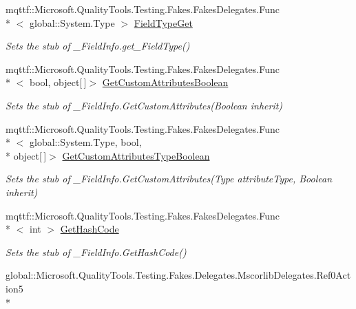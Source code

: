 \begin{DoxyCompactItemize}
mqttf\-::\-Microsoft.\-Quality\-Tools.\-Testing.\-Fakes.\-Fakes\-Delegates.\-Func\\*
$<$ global\-::\-System.\-Type $>$ \hyperlink{class_system_1_1_runtime_1_1_interop_services_1_1_fakes_1_1_stub___field_info_a4656cc895cf577c86e745431b84e3920}{Field\-Type\-Get}
\begin{DoxyCompactList}\small\item\em Sets the stub of \-\_\-\-Field\-Info.\-get\-\_\-\-Field\-Type()\end{DoxyCompactList}\item 
mqttf\-::\-Microsoft.\-Quality\-Tools.\-Testing.\-Fakes.\-Fakes\-Delegates.\-Func\\*
$<$ bool, object\mbox{[}$\,$\mbox{]}$>$ \hyperlink{class_system_1_1_runtime_1_1_interop_services_1_1_fakes_1_1_stub___field_info_a3eb9ddd9adad904f86bac9b9d4c21a9c}{Get\-Custom\-Attributes\-Boolean}
\begin{DoxyCompactList}\small\item\em Sets the stub of \-\_\-\-Field\-Info.\-Get\-Custom\-Attributes(\-Boolean inherit)\end{DoxyCompactList}\item 
mqttf\-::\-Microsoft.\-Quality\-Tools.\-Testing.\-Fakes.\-Fakes\-Delegates.\-Func\\*
$<$ global\-::\-System.\-Type, bool, \\*
object\mbox{[}$\,$\mbox{]}$>$ \hyperlink{class_system_1_1_runtime_1_1_interop_services_1_1_fakes_1_1_stub___field_info_a2c4b375ed678cfe82781c02e8293ce98}{Get\-Custom\-Attributes\-Type\-Boolean}
\begin{DoxyCompactList}\small\item\em Sets the stub of \-\_\-\-Field\-Info.\-Get\-Custom\-Attributes(\-Type attribute\-Type, Boolean inherit)\end{DoxyCompactList}\item 
mqttf\-::\-Microsoft.\-Quality\-Tools.\-Testing.\-Fakes.\-Fakes\-Delegates.\-Func\\*
$<$ int $>$ \hyperlink{class_system_1_1_runtime_1_1_interop_services_1_1_fakes_1_1_stub___field_info_a3f042fa893056f051c27b3162de14624}{Get\-Hash\-Code}
\begin{DoxyCompactList}\small\item\em Sets the stub of \-\_\-\-Field\-Info.\-Get\-Hash\-Code()\end{DoxyCompactList}\item 
global\-::\-Microsoft.\-Quality\-Tools.\-Testing.\-Fakes.\-Delegates.\-Mscorlib\-Delegates.\-Ref0\-Action5\\*

\end{DoxyCompactItemize}
